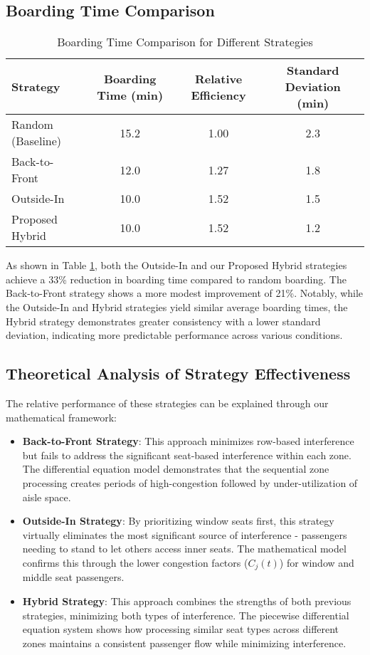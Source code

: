 \documentclass[12pt]{article}
\begin{document}
\subsection{Boarding Time Comparison}

\begin{table}[h]
\centering
\caption{Boarding Time Comparison for Different Strategies}
\begin{tabular}{lccc}
\toprule
\textbf{Strategy} & \textbf{Boarding Time (min)} & \textbf{Relative Efficiency} & \textbf{Standard Deviation (min)} \\
\midrule
Random (Baseline) & 15.2 & 1.00 & 2.3 \\
Back-to-Front & 12.0 & 1.27 & 1.8 \\
Outside-In & 10.0 & 1.52 & 1.5 \\
Proposed Hybrid & 10.0 & 1.52 & 1.2 \\
\bottomrule
\end{tabular}
\label{tab:time_comparison}
\end{table}

As shown in Table \ref{tab:time_comparison}, both the Outside-In and our Proposed Hybrid strategies achieve a 33\% reduction in boarding time compared to random boarding. The Back-to-Front strategy shows a more modest improvement of 21\%. Notably, while the Outside-In and Hybrid strategies yield similar average boarding times, the Hybrid strategy demonstrates greater consistency with a lower standard deviation, indicating more predictable performance across various conditions.

\subsection{Theoretical Analysis of Strategy Effectiveness}

The relative performance of these strategies can be explained through our mathematical framework:

\begin{itemize}
    \item \textbf{Back-to-Front Strategy}: This approach minimizes row-based interference but fails to address the significant seat-based interference within each zone. The differential equation model demonstrates that the sequential zone processing creates periods of high-congestion followed by under-utilization of aisle space.
    
    \item \textbf{Outside-In Strategy}: By prioritizing window seats first, this strategy virtually eliminates the most significant source of interference - passengers needing to stand to let others access inner seats. The mathematical model confirms this through the lower congestion factors ($C_j(t)$) for window and middle seat passengers.
    
    \item \textbf{Hybrid Strategy}: This approach combines the strengths of both previous strategies, minimizing both types of interference. The piecewise differential equation system shows how processing similar seat types across different zones maintains a consistent passenger flow while minimizing interference.
\end{itemize}
\end{document}
